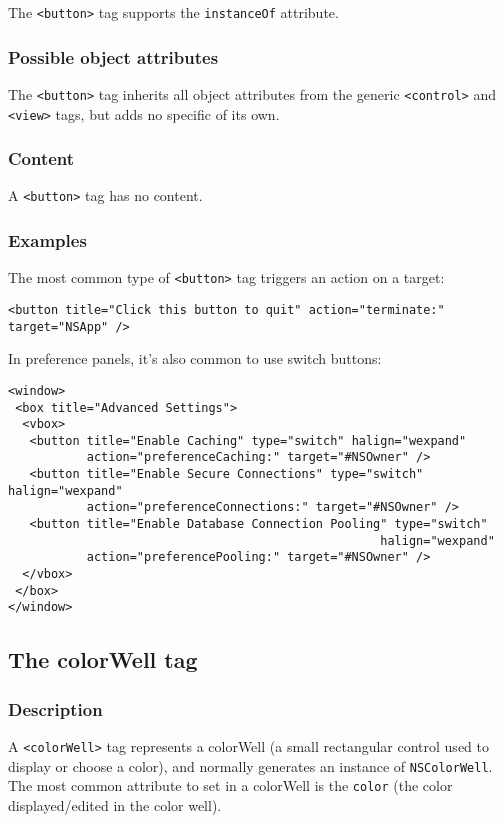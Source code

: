 The \texttt{<button>} tag supports the \texttt{instanceOf} attribute.

\subsubsection{Possible object attributes}
The \texttt{<button>} tag inherits all object attributes from the
generic \texttt{<control>} and \texttt{<view>} tags, but adds no
specific of its own.

\subsubsection{Content}
A \texttt{<button>} tag has no content.

\subsubsection{Examples}
The most common type of \texttt{<button>} tag triggers an action on a
target:
\begin{verbatim}
<button title="Click this button to quit" action="terminate:" target="NSApp" />
\end{verbatim}
In preference panels, it's also common to use switch buttons:
\begin{verbatim}
<window>
 <box title="Advanced Settings">
  <vbox>
   <button title="Enable Caching" type="switch" halign="wexpand" 
           action="preferenceCaching:" target="#NSOwner" />
   <button title="Enable Secure Connections" type="switch" halign="wexpand" 
           action="preferenceConnections:" target="#NSOwner" />
   <button title="Enable Database Connection Pooling" type="switch" 
                                                    halign="wexpand" 
           action="preferencePooling:" target="#NSOwner" />
  </vbox>
 </box>
</window>
\end{verbatim}

\subsection{The colorWell tag}

\subsubsection{Description}

A \texttt{<colorWell>} tag represents a colorWell (a small rectangular
control used to display or choose a color), and normally generates an
instance of \texttt{NSColorWell}.  The most common attribute to set in
a colorWell is the \texttt{color} (the color displayed/edited in the
color well).

